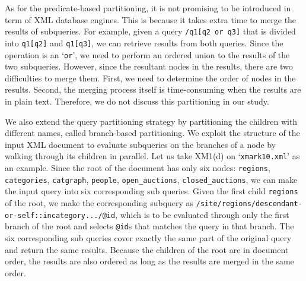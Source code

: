 As for the predicate-based partitioning, it is not promising to be introduced in
term of XML database engines. This is because it takes extra time to merge the
results of subqueries. For example, given a query \texttt{/q1[q2 or q3]} that is
divided into \texttt{q1[q2]} and \texttt{q1[q3]}, we can retrieve results from
both queries. Since the operation is an `\texttt{or}', we need to perform an
ordered union to the results of the two subqueries. However, since the resultant
nodes in the results, there are two difficulties to merge them. First, we need
to determine the order of nodes in the results. Second, the merging process
itself is time-consuming when the results are in plain text. Therefore, we do
not discuss this partitioning in our study.

We also extend the query partitioning strategy by partitioning the children with
different names, called branch-based partitioning. We exploit the structure of
the input XML document to evaluate subqueries on the branches of a node by
walking through its children in parallel. Let us take XM1(d) on
`\texttt{xmark10.xml}' as an example. Since the root of the document has only
six nodes:
\texttt{regions}, 
\texttt{categories}, 
\texttt{catgraph}, 
\texttt{people},
\texttt{open\_auctions},
\texttt{closed\_auctions}, 
we can make the input query into six corresponding sub
queries. Given the first child \texttt{regions} of the root, we make the
corresponding subquery as
\verb|/site/regions/descendant-or-self::incategory.../@id|, which is to be
evaluated through only the first branch of the root  and selects \texttt{@id}s
that matches the query in that branch. 
The six corresponding sub queries cover exactly the same part of the
original query and return the same results. Because the children of the root are
in document order, the results are also ordered as long as the results are
merged in the same order.


